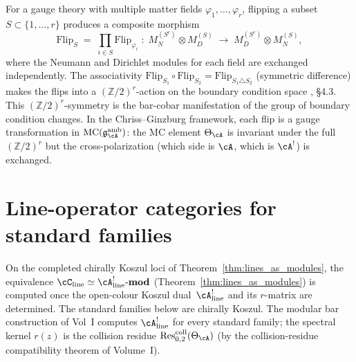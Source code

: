 \begin{example}
\label{ex:composite-flips}
For a gauge theory with multiple matter fields $\varphi_1, \ldots,
\varphi_r$, flipping a subset $S \subset \{1,\ldots,r\}$ produces a
composite morphism
\begin{equation}\label{eq:composite-flip}
 \mathrm{Flip}_S
 \;=\;
 \prod_{i \in S} \mathrm{Flip}_{\varphi_i}
 \;:\;
 M_{N}^{(S^c)} \otimes M_{D}^{(S)}
 \;\longrightarrow\;
 M_{D}^{(S^c)} \otimes M_{N}^{(S)},
\end{equation}
where the Neumann and Dirichlet modules for each field are exchanged
independently. The associativity
$\mathrm{Flip}_{S_1} \circ \mathrm{Flip}_{S_2} =
\mathrm{Flip}_{S_1 \triangle S_2}$ (symmetric difference) makes the
flips into a $(\mathbb{Z}/2)^r$-action on the boundary condition
space \cite{CDG2023}, \S4.3. This $(\mathbb{Z}/2)^r$-symmetry is
the bar-cobar manifestation of the group of boundary condition
changes. In the Chriss--Ginzburg framework, each flip is a
gauge transformation in $\operatorname{MC}(\mathfrak{g}^{\mathrm{amb}}_{\cA})$:
the MC element $\Theta_{\cA}$ is invariant under the full
$(\mathbb{Z}/2)^r$ but the cross-polarization
(which side is $\cA$, which is $\cA^!$) is exchanged.
\end{example}


\section{Line-operator categories for standard families}
\label{sec:line-operator-standard-families}

On the completed chirally Koszul loci of
Theorem~\ref{thm:lines_as_modules}, the equivalence
$\cC_{\mathrm{line}}\simeq\cA^!_{\mathrm{line}}\text{-}\mathbf{mod}$
(Theorem~\ref{thm:lines_as_modules}) is computed once the
open-colour Koszul dual~$\cA^!_{\mathrm{line}}$ and its $r$-matrix
are determined. The standard families below are chirally Koszul.
The modular bar construction of Vol~I computes
$\cA^!_{\mathrm{line}}$ for every standard family; the spectral
kernel $r(z)$ is the collision residue
$\operatorname{Res}^{\mathrm{coll}}_{0,2}(\Theta_\cA)$ (by the
collision-residue compatibility theorem of Volume~I).


